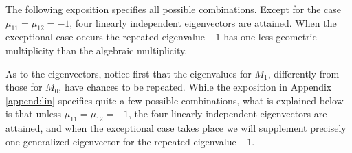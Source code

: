 \documentclass[a4paper,11pt]{article}
\theoremstyle{remark}
\begin{document}

The following exposition specifies all possible combinations. Except for the case $\mu_{11}=\mu_{12}=-1$, four linearly independent eigenvectors are attained. 
When the exceptional case occurs the repeated eigenvalue $-1$ has one less geometric multiplicity than the algebraic multiplicity.%

As to the eigenvectors, notice first that the eigenvalues for $M_1$, differently from those for $M_0$, have chances to be repeated. While the exposition in
Appendix \ref{append:lin} specifies quite a few possible combinations, 
what is explained below is that unless $\mu_{11}=\mu_{12}=-1$, the four linearly independent eigenvectors are attained, and when the exceptional case takes place we will supplement precisely one generalized eigenvector for the repeated eigenvalue $-1$.
\end{document}
